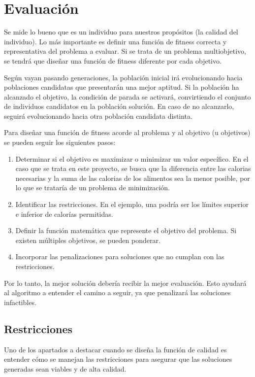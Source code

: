 \section{Evaluación}

Se mide lo bueno que es un individuo para nuestros propósitos (la calidad del individuo). Lo más importante es definir una función de fitness correcta y representativa del problema a evaluar. Si se trata de un problema multiobjetivo, se tendrá que diseñar una función de fitness diferente por cada objetivo.

Según vayan pasando generaciones, la población inicial irá evolucionando hacia poblaciones candidatas que presentarán una mejor aptitud. Si la población ha alcanzado el objetivo, la condición de parada se activará, convirtiendo el conjunto de individuos candidatos en la población solución. En caso de no alcanzarlo, seguirá evolucionando hacia otra población candidata distinta.

Para diseñar una función de fitness acorde al problema y al objetivo (u objetivos) se pueden seguir los siguientes pasos:

\begin{enumerate}
  \item Determinar si el objetivo es maximizar o minimizar un valor específico. En el caso que se trata en este proyecto, se busca que la diferencia entre las calorias necesarias y la suma de las calorias de los alimentos sea la menor posible, por lo que se trataría de un problema de minimización.
  \item Identificar las restricciones. En el ejemplo, una podría ser los límites superior e inferior de calorías permitidas.
  \item Definir la función matemática que represente el objetivo del problema. Si existen múltiples objetivos, se pueden ponderar.
  \item Incorporar las penalizaciones para soluciones que no cumplan con las restricciones.
\end{enumerate}

Por lo tanto, la mejor solución debería recibir la mejor evaluación. Esto ayudará al algoritmo a entender el camino a seguir, ya que penalizará las soluciones infactibles.

\subsection{Restricciones}

Uno de los apartados a destacar cuando se diseña la función de calidad es entender cómo se manejan las restricciones para asegurar que las soluciones generadas sean viables y de alta calidad.

